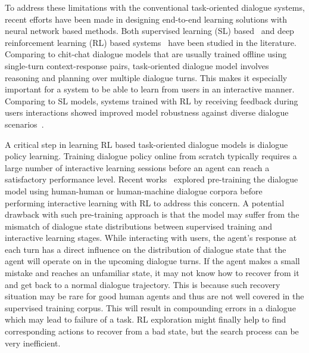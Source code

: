 \documentclass[11pt,a4paper]{article}
\begin{document}
    To address these limitations with the conventional task-oriented dialogue systems, recent efforts have been made in designing end-to-end learning solutions with neural network based methods. Both supervised learning (SL) based~\cite{wenN2N16,bordes2017,Liu2017} and deep reinforcement learning (RL) based systems~\cite{zhao2016towards,li2017end,peng2017composite} have been studied in the literature. Comparing to chit-chat dialogue models that are usually trained offline using single-turn context-response pairs, task-oriented dialogue model involves reasoning and planning over multiple dialogue turns. This makes it especially important for a system to be able to learn from users in an interactive manner. Comparing to SL models, systems trained with RL by receiving feedback during users interactions showed improved model robustness against diverse dialogue scenarios~\cite{williams2016end,liu2017iterative}. 
    
    A critical step in learning RL based task-oriented dialogue models is dialogue policy learning. Training dialogue policy online from scratch typically requires a large number of interactive learning sessions before an agent can reach a satisfactory performance level. Recent works~\cite{henderson2008hybrid,williams2017hybrid,liu2017e2e} explored pre-training the dialogue model using human-human or human-machine dialogue corpora before performing interactive learning with RL to address this concern. A potential drawback with such pre-training approach is that the model may suffer from the mismatch of dialogue state distributions between supervised training and interactive learning stages. While interacting with users, the agent's response at each turn has a direct influence on the distribution of dialogue state that the agent will operate on in the upcoming dialogue turns. If the agent makes a small mistake and reaches an unfamiliar state, it may not know how to recover from it and get back to a normal dialogue trajectory. This is because such recovery situation may be rare for good human agents and thus are not well covered in the supervised training corpus. This will result in compounding errors in a dialogue which may lead to failure of a task. RL exploration might finally help to find corresponding actions to recover from a bad state, but the search process can be very inefficient. 
    
\end{document}
